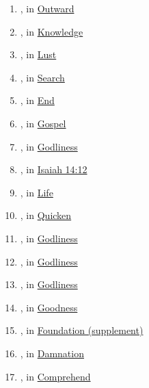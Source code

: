 \begin{enumerate}
		\item \hyperref[EXOTHEN]{}, in \hyperref[OUTWARD]{Outward}
		
		\item \hyperref[EPIGINOSKO]{}, in \hyperref[KNOWLEDGE]{Knowledge}
		
		\item \hyperref[EPITHUMEO]{}, in \hyperref[LUST]{Lust}
		
		\item \hyperref[ERAUNAO]{}, in \hyperref[SEARCH]{Search}
		
		\item \hyperref[ESCHATOS]{}, in \hyperref[END]{End}
		
		\item \hyperref[EUAGGELION]{}, in \hyperref[GOSPEL]{Gospel}
		
		\item \hyperref[EUSEBEIA]{}, in \hyperref[GODLINESS]{Godliness}
		
		\item \hyperref[HEOSPHOROS]{}, in \hyperref[ISAIAH-14-12]{Isaiah 14:12}
		
		\item \hyperref[ZAO]{}, in \hyperref[LIFE]{Life}
		
		\item \hyperref[ZOOPOIEO]{}, in \hyperref[QUICKEN]{Quicken}
		
		\item \hyperref[THEOSEBEIA]{}, in \hyperref[GODLINESS]{Godliness}
		
		\item \hyperref[THEIOTES]{}, in \hyperref[GODLINESS]{Godliness}
		
		\item \hyperref[THEOTES]{}, in \hyperref[GODLINESS]{Godliness}
		
		\item \hyperref[KALOS]{}, in \hyperref[GOODNESS]{Goodness}
		
		\item \hyperref[KATABOLE]{}, in \hyperref[FOUNDATION]{Foundation (supplement)}
		
		\item \hyperref[KATAKRINO]{}, in \hyperref[DAMNATION]{Damnation}
		
		\item \hyperref[KATALAMBANO]{}, in \hyperref[COMPREHEND]{Comprehend}
	

\end{enumerate}
